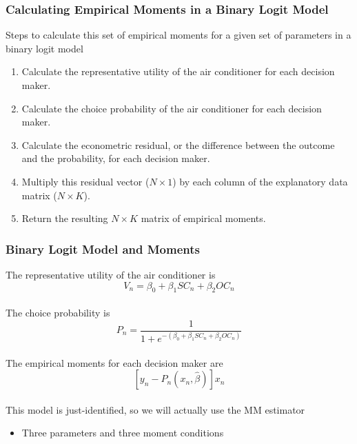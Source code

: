 \documentclass{beamer}\usepackage[]{graphicx}\usepackage[]{color}
\begin{document}
\begin{frame}\frametitle{Calculating Empirical Moments in a Binary Logit Model}
    Steps to calculate this set of empirical moments for a given set of parameters in a binary logit model
    \begin{enumerate}
        \item Calculate the representative utility of the air conditioner for each decision maker.
        \item Calculate the choice probability of the air conditioner for each decision maker.
        \item Calculate the econometric residual, or the difference between the outcome and the probability, for each decision maker.
        \item Multiply this residual vector ($N \times 1$) by each column of the explanatory data matrix ($N \times K$).
        \item Return the resulting $N \times K$ matrix of empirical moments.
    \end{enumerate}
\end{frame}

\begin{frame}\frametitle{Binary Logit Model and Moments}
    The representative utility of the air conditioner is
    $$V_n = \beta_0 + \beta_1 SC_n + \beta_2 OC_n$$ \\
    \vspace{2ex}
    The choice probability is
    $$P_n = \frac{1}{1 + e^{-(\beta_0 + \beta_1 SC_n + \beta_2 OC_n)}}$$ \\
    \vspace{2ex}
    The empirical moments for each decision maker are
    $$[y_n - P_n(x_n, \hat{\beta})] x_n$$ \\
    \vspace{2ex}
    This model is just-identified, so we will actually use the MM estimator
    \begin{itemize}
        \item Three parameters and three moment conditions
    \end{itemize}
\end{frame}
\end{document}
